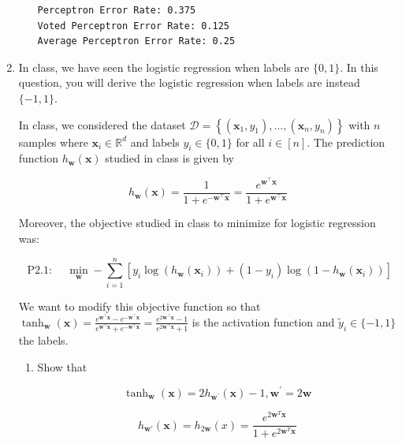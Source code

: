 \documentclass[letterpaper]{article}
\theoremstyle{definition}
\begin{document}
\begin{enumerate}
\begin{enumerate}
\begin{verbatim}
Perceptron Error Rate: 0.375
Voted Perceptron Error Rate: 0.125
Average Perceptron Error Rate: 0.25
\end{verbatim}
\color{black}
\end{enumerate}

\item In class, we have seen the logistic regression when labels are \(\{0,1\}\). In this question,
you will derive the logistic regression when labels are instead \(\{-1,1\}\).

In class, we considered the dataset \(\mathcal{D}=\left\{\left(\mathbf{x}_{1}, y_{1}\right), \ldots,\left(\mathbf{x}_{n}, y_{n}\right)\right\}\) with \(n\) samples where \(\mathbf{x}_{i} \in \mathbb{R}^{d}\) and labels \(y_{i} \in\{0,1\}\) for all \(i \in[n]\). The prediction function \(h_{\mathbf{w}}(\mathbf{x})\) studied in class is given by

\begin{equation*}
h_{\mathbf{w}}(\mathbf{x})=\frac{1}{1+e^{-\mathbf{w}^{\top} \mathbf{x}}}=\frac{e^{\mathbf{w}^{\top} \mathbf{x}}}{1+e^{\mathbf{w}^{\top} \mathbf{x}}} \tag{1}
\end{equation*}

Moreover, the objective studied in class to minimize for logistic regression was:

\begin{equation*}
\text { P2.1: } \quad \min _{\mathbf{w}}-\sum_{i=1}^{n}\left[y_{i} \log \left(h_{\mathbf{w}}\left(\mathbf{x}_{i}\right)\right)+\left(1-y_{i}\right) \log \left(1-h_{\mathbf{w}}\left(\mathbf{x}_{i}\right)\right)\right] \tag{2}
\end{equation*}

We want to modify this objective function so that \(\tanh _{\mathbf{w}}(\mathbf{x})=\frac{e^{\mathbf{w}^{\top} \mathbf{x}}-e^{-\mathbf{w}^{\top} \mathbf{x}}}{e^{\mathbf{w}^{\top} \mathbf{x}}+e^{-\mathbf{w}^{\top} \mathbf{x}}}=\frac{e^{2 \mathbf{w}^{\top} \mathbf{x}}-1}{e^{2 \mathbf{w}^{\top} \mathbf{x}}+1}\) is the activation function and \(\tilde{y}_{i} \in\{-1,1\}\) the labels.

\begin{enumerate}
\item Show that

$$
      \tanh _{\mathbf{w}}(\mathbf{x})=2 h_{\mathbf{w}^{\prime}}(\mathbf{x})-1, \mathbf{w}^{\prime}=2 \mathbf{w}
      $$

\color{teal}
$$
      h_{\mathbf{w}'}(\mathbf{x}) = h_{2\mathbf{w}}(x) = \frac{e^{2\mathbf{w}^T\mathbf{x}}}{1 + e^{2\mathbf{w}^T\mathbf{x}}}
      $$


\end{enumerate}
\end{enumerate}
\end{document}
